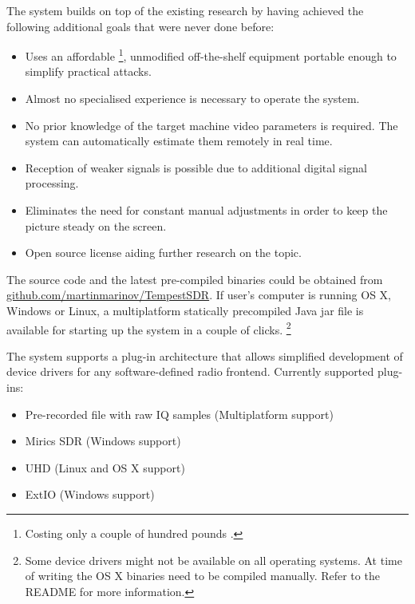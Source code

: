 \documentclass[a4paper,12pt,twoside,openright]{report}
\begin{document}
The system builds on top of the existing research by having achieved the following additional goals that were never done before:

\begin{itemize}

  \item Uses an affordable \footnote{Costing only a couple of hundred pounds \cite{ettusb200}.}, unmodified off-the-shelf equipment portable enough to simplify practical attacks.
  \item Almost no specialised experience is necessary to operate the system.
  \item No prior knowledge of the target machine video parameters is required. The system can automatically estimate them remotely in real time.
  \item Reception of weaker signals is possible due to additional digital signal processing.
  \item Eliminates the need for constant manual adjustments in order to keep the picture steady on the screen.
  \item Open source license aiding further research on the topic.

\end{itemize}

The source code and the latest pre-compiled binaries could be obtained from \href{https://github.com/martinmarinov/TempestSDR}{github.com/martinmarinov/TempestSDR}. If user's computer is running OS X, Windows or Linux, a multiplatform statically precompiled Java jar file is available for starting up the system in a couple of clicks.
\footnote{Some device drivers might not be available on all operating systems. At time of writing the OS X binaries need to be compiled manually. Refer to the README for more information.}

The system supports a plug-in architecture that allows simplified development of device drivers for any software-defined radio frontend. Currently supported plug-ins:

\begin{itemize}

  \item Pre-recorded file with raw IQ samples (Multiplatform support)
  \item Mirics SDR (Windows support)
  \item UHD (Linux and OS X support)
  \item ExtIO (Windows support)

\end{itemize}
\end{document}
